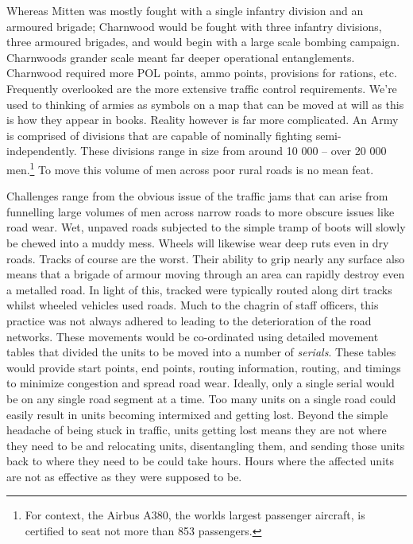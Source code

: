 \documentclass[noraggedright]{turabian-researchpaper}
\begin{document}
Whereas Mitten was mostly fought with a single infantry division and an armoured
brigade; Charnwood would be fought with three infantry divisions, three 
armoured brigades, and would begin with a large scale bombing campaign.
Charnwoods grander scale meant far deeper operational entanglements.  
Charnwood required more POL points, ammo points, provisions for rations, etc.
Frequently overlooked are the more extensive traffic control 
requirements.  We're used to thinking of armies as symbols on a map that can
be moved at will as this is how they appear in books.  Reality however is 
far more complicated.  An Army is comprised of divisions that are capable of 
nominally fighting semi-independently.  These divisions range in size from
around 10 000 -- over 20 000 men.\footnote{For context, the Airbus A380, the
worlds largest passenger aircraft, is certified to seat not more than 853
passengers.%
}  To move this volume of men across poor rural roads 
is no mean feat.

Challenges range from the obvious issue of the traffic jams that can arise from
funnelling large volumes of men across narrow roads to more obscure issues like 
road wear.  Wet, unpaved roads subjected to the simple tramp of boots will
slowly be chewed into a muddy mess.  Wheels will likewise wear deep ruts even 
in dry roads.  Tracks of course are the worst.  Their ability to grip nearly
any surface also means that a brigade of armour moving through an area can
rapidly destroy even a metalled road.  In light of this, tracked were 
typically routed along dirt tracks whilst wheeled vehicles used roads.  Much
to the chagrin of staff officers, this practice was not always adhered to
leading to the deterioration of the road networks.\autocite[27 Armd Bde Adm 
Order No 8 (See July Appendix)][Para 3]{27wd}
These movements would be co-ordinated using detailed movement tables that 
divided the units to be moved into a number of \textit{serials}. 
These tables would provide start points, end points, routing 
information, routing, and timings to minimize congestion and spread road wear.
Ideally, only a single serial would be on any single road segment at a time.
Too many units on a single road could easily result in units becoming 
intermixed and getting lost.  Beyond the simple headache of being stuck in 
traffic, units getting lost means they are not where they need to be and
relocating units, disentangling them, and sending those units back to where
they need to be could take hours.  Hours where the affected units are not
as effective as they were supposed to be.  
\end{document}
